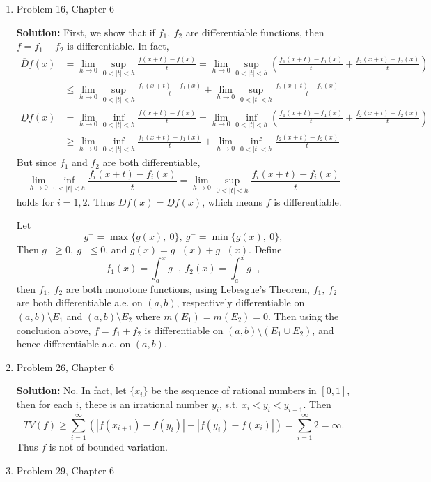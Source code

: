\documentclass{article}%
\begin{document}
\begin{enumerate}
\bigskip
\item  Problem 16, Chapter 6

\smallskip
\textbf{Solution:}
\smallskip
First, we show that if $f_1, ~f_2$ are differentiable functions, then $f = f_1+f_2$ is differentiable. In fact,
$$
\begin{aligned}
\overline{D}f(x) &= \lim_{h\to 0}\sup_{0 < |t| < h}\frac{f(x+t)-f(x)}{t} = \lim_{h\to 0}\sup_{0 < |t| < h}(\frac{f_1(x+t)-f_1(x)}{t}+\frac{f_2(x+t)-f_2(x)}{t}) \\
&\le \lim_{h\to 0}\sup_{0 < |t| < h}\frac{f_1(x+t)-f_1(x)}{t} + \lim_{h\to 0}\sup_{0 < |t| < h}\frac{f_2(x+t)-f_2(x)}{t}
\end{aligned}
$$
$$
\begin{aligned}
\underline{D}f(x) &= \lim_{h\to 0}\inf_{0 < |t| < h}\frac{f(x+t)-f(x)}{t} = \lim_{h\to 0}\inf_{0 < |t| < h}(\frac{f_1(x+t)-f_1(x)}{t}+\frac{f_2(x+t)-f_2(x)}{t}) \\
&\ge \lim_{h\to 0}\inf_{0 < |t| < h}\frac{f_1(x+t)-f_1(x)}{t} + \lim_{h\to 0}\inf_{0 < |t| < h}\frac{f_2(x+t)-f_2(x)}{t}
\end{aligned}
$$
But since $f_1$ and $f_2$ are both differentiable, 
$$
\lim_{h\to 0}\inf_{0 < |t| < h}\frac{f_i(x+t)-f_i(x)}{t} = \lim_{h\to 0}\sup_{0 < |t| < h}\frac{f_i(x+t)-f_i(x)}{t}
$$
holds for $i = 1, 2$. Thus $\overline{D}f(x) = \underline{D}f(x)$, which means $f$ is differentiable.

Let
$$
g^+ = \max\{g(x), ~0\}, ~g^- = \min\{g(x), ~0\},
$$
Then $g^+ \ge 0, ~g^- \le 0$, and $g(x) = g^+(x) + g^-(x)$. Define
$$
f_1(x) = \int_{a}^{x}g^+, ~f_2(x) = \int_{a}^{x}g^-,
$$
then $f_1, ~f_2$ are both monotone functions, using Lebesgue's Theorem, $f_1, ~f_2 $ are both differentiable a.e. on $(a, b)$, respectively differentiable on $(a, b)\setminus E_1 $ and $(a, b) \setminus E_2 $ where $m(E_1) = m(E_2) = 0$. Then using the conclusion above, $f = f_1 + f_2 $ is differentiable on $(a, b)\setminus (E_1\cup E_2)$, and hence differentiable a.e. on $(a, b)$.


\item  Problem 26, Chapter 6

\smallskip
\textbf{Solution:}
No. In fact, let $\{x_i\}$ be the sequence of rational numbers in $[0, 1]$, then for each $i$, there is an irrational number $y_i $, s.t.
$x_i < y_i < y_{i+1} $. Then
$$
TV(f) \ge \sum_{i=1}^{\infty}(|f(x_{i+1})-f(y_i)|+|f(y_i)-f(x_i)|) = \sum_{i=1}^{\infty}2 = \infty.
$$
Thus $f$ is not of bounded variation.

\bigskip
\item  Problem 29, Chapter 6


\end{enumerate}
\end{document}

